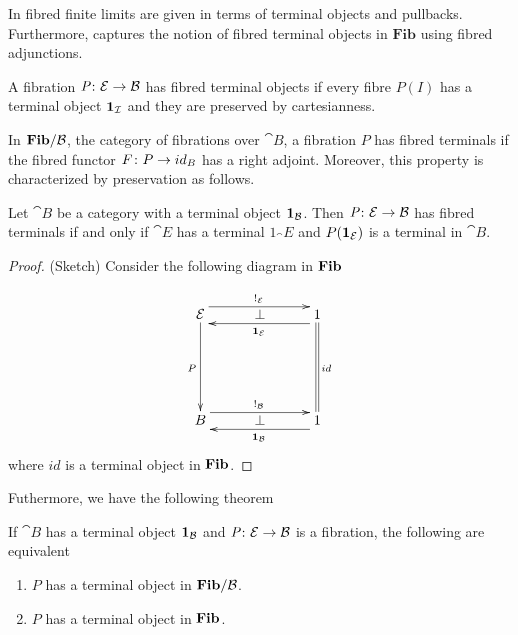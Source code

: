 \documentclass[9pt, leqno]{amsart}
\begin{document}
In \cite{TS} fibred finite limits are given in terms of terminal objects and pullbacks. Furthermore, \cite{JacobsCLTT} captures the notion of fibred terminal objects in $\mathbf{Fib}$ using fibred adjunctions. 

\begin{defn}
	A fibration $\operatorname{\textit{P} \colon \mathcal{E} \rightarrow \mathcal{B}}$ has fibred terminal objects if every fibre $P(I)$ has a terminal object $\mathbf{1}_{\mathcal{I}}$ and they are preserved by cartesianness.
\end{defn}

In $\mathbf{Fib}/\mathcal{B}$, the category of fibrations over $\cat{B}$, a fibration $P$ has fibred terminals if the fibred functor $F \colon P \rightarrow id_B$ has a right adjoint. Moreover, this property is characterized by preservation as follows.

\begin{lemma}\label{fibredterminals}
	Let $\cat{B}$ be a category with a terminal object $\mathbf{1}_{\mathcal{B}}$. Then $\operatorname{\textit{P} \colon \mathcal{E} \rightarrow \mathcal{B}}$ has fibred terminals if and only if $\cat{E}$ has a terminal $1_\cat{E}$ and $P(\mathbf{1}_{\mathcal{E}})$ is a terminal in $\cat{B}$.
\end{lemma}

\begin{proof}(Sketch)
	Consider the following diagram in $\operatorname{\mathbf{Fib}}$
	
	\begin{equation*}
		\xymatrix@=1cm{
			\cat{E} \ar[dd]_{P} \ar@<1.4ex>[rr]^{!_\cat{E}} & \perp & 1 \ar@<1.4ex>[ll]^{\ter{E}} \ar@{=}[dd]^{id}\\
			\\
			B \ar@<1.4ex>[rr]^{!_\cat{B}} & \perp & 1 \ar@<1.4ex>[ll]^{\ter{B}}
		}
	\end{equation*}
	where $id$ is a terminal object in $\operatorname{\mathbf{Fib}}$.
\end{proof}

Futhermore, we have the following theorem

\begin{thm}
	If $\cat{B}$ has a terminal object $\mathbf{1}_{\mathcal{B}}$ and $\operatorname{\textit{P} \colon \mathcal{E} \rightarrow \mathcal{B}}$ is a fibration, the following are equivalent
	\begin{enumerate}
		\item $P$ has a terminal object in $\mathbf{Fib}/\mathcal{B}$. \\
		\item  $P$ has a terminal object in $\operatorname{\mathbf{Fib}}$.
	\end{enumerate}
\end{thm}

%	
\end{document}
